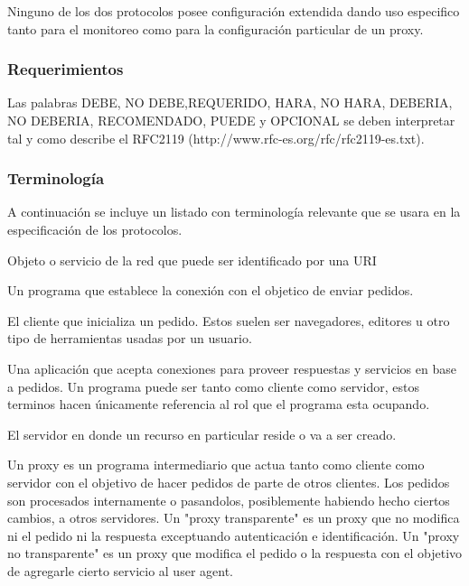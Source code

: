 \documentclass[a4paper,10pt]{article}
\begin{document}
Ninguno de los dos protocolos posee configuración extendida dando uso especifico tanto para el monitoreo 
como para la configuración particular de un proxy.

\subsubsection{Requerimientos}

Las palabras DEBE, NO DEBE,REQUERIDO, HARA, NO HARA, DEBERIA, NO DEBERIA, 
RECOMENDADO, PUEDE y OPCIONAL se deben interpretar tal y como describe el 
RFC2119 (http://www.rfc-es.org/rfc/rfc2119-es.txt).

\subsubsection{Terminolog\'ia}

A continuación se incluye un listado con terminolog\'ia relevante que se usara en la 
especificaci\'on de los protocolos.


Objeto o servicio de la red que puede ser identificado por una URI


Un programa que establece la conexi\'on con el objetico de enviar pedidos.


El cliente que inicializa un pedido. Estos suelen ser navegadores, editores u otro 
tipo de herramientas usadas por un usuario.


Una aplicaci\'on que acepta conexiones para proveer respuestas y servicios en base 
a pedidos. Un programa puede ser tanto como cliente como servidor, estos terminos 
hacen \'unicamente referencia al rol que el programa esta ocupando.


El servidor en donde un recurso en particular reside o va a ser creado.


Un proxy es un programa intermediario que actua tanto como cliente como servidor 
con el objetivo de hacer pedidos de parte de otros clientes. Los pedidos son procesados internamente 
o pasandolos, posiblemente habiendo hecho ciertos cambios, a otros servidores. Un 
"proxy transparente" es un proxy que no modifica ni el pedido ni la respuesta exceptuando autenticaci\'on e 
identificaci\'on. Un "proxy no transparente" es un proxy que modifica el pedido o la respuesta con el 
objetivo de agregarle cierto servicio al user agent.
\end{document}
